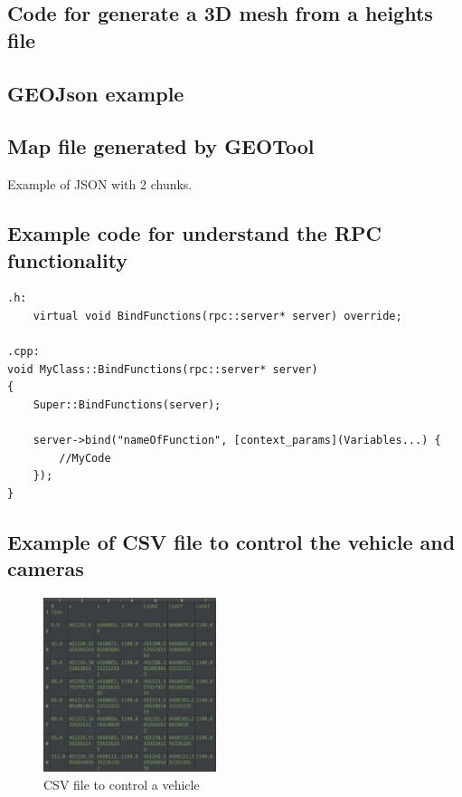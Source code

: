 \documentclass[10pt,a4paper,twocolumn,twoside]{article}
\begin{document}
\subsection{Code for generate a 3D mesh from a heights file}
\label{appendix:generateobj}


\subsection{GEOJson example}
\label{appendix:geojson}


\subsection{Map file generated by GEOTool}
\label{appendix:mapjson}

Example of JSON with 2 chunks.


\subsection{Example code for understand the RPC functionality}
\label{appendix:extendrpc}

\lstset{language=C} 
\begin{lstlisting}
.h:
	virtual void BindFunctions(rpc::server* server) override;
	
.cpp:
void MyClass::BindFunctions(rpc::server* server)
{
	Super::BindFunctions(server);

	server->bind("nameOfFunction", [context_params](Variables...) {
		//MyCode
	});
}

\end{lstlisting}

\subsection{Example of CSV file to control the vehicle and cameras}
\label{appendix:fitxerscsv}

\begin{figure}[!h]
\centering
  	\includegraphics[width=0.45\textwidth]{fitxervehicle}
	\captionsetup{labelformat=empty}
	\caption{CSV file to control a vehicle}
	\label{fig-fitxervehicle}
\end{figure}
\end{document}
